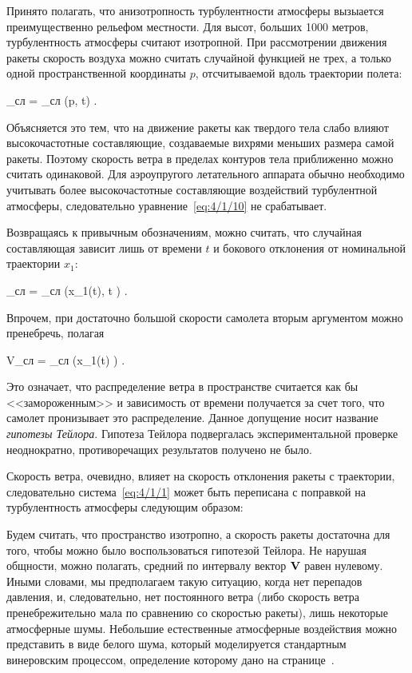Принято полагать, что анизотропность турбулентности атмосферы вызыается преимущественно рельефом местности. Для высот, больших 1000 метров, турбулентность атмосферы считают изотропной. При рассмотрении движения ракеты скорость воздуха можно считать случайной функцией не трех, а только одной пространственной координаты $p$, отсчитываемой вдоль траектории полета:

	_{\mbox{сл}} = _{\mbox{сл}} (p, t) \mbox{.}
\eeq

Объясняется это тем, что на движение ракеты как твердого тела слабо влияют высокочастотные составляющие\cite{KRASOVSKY}, создаваемые вихрями меньших размера самой ракеты. Поэтому скорость ветра в пределах контуров тела приближенно можно считать одинаковой. Для аэроупругого летательного аппарата обычно необходимо учитывать более высокочастотные составляющие воздействий турбулентной атмосферы, следовательно уравнение~\ref{eq:4/1/10} не срабатывает.

Возвращаясь к привычным обозначениям, можно считать, что случайная составляющая зависит лишь от времени $t$ и бокового отклонения от номинальной траектории $x_1$:

	_{\mbox{сл}} = _{\mbox{сл}} \bigl(x_1(t), t \bigr) \mbox{.}
\eeq

Впрочем, при достаточно большой скорости самолета вторым аргументом можно пренебречь, полагая

	V_{\mbox{сл}} = _{\mbox{сл}} \bigl(x_1(t) \bigr) \mbox{.}
\eeq

Это означает, что распределение ветра в пространстве считается как бы <<замороженным>> и зависимость от времени получается за счет того, что самолет пронизывает это распределение. Данное допущение носит название \emph{гипотезы Тейлора}\cite{MONIN}. Гипотеза Тейлора подвергалась экспериментальной проверке неоднократно, противоречащих результатов получено не было.

Скорость ветра, очевидно, влияет на скорость отклонения ракеты с траектории, следовательно система~\vref{eq:4/1/1} может быть переписана с поправкой на турбулентность атмосферы следующим образом:

\eeq

Будем считать, что пространство изотропно, а скорость ракеты достаточна для того, чтобы можно было воспользоваться гипотезой Тейлора. Не нарушая общности, можно полагать, средний по интервалу вектор $\mathbf{V}$ равен нулевому. Иными словами, мы предполагаем такую ситуацию, когда нет перепадов давления, и, следовательно, нет постоянного ветра (либо скорость ветра пренебрежительно мала по сравнению со скоростью ракеты), лишь некоторые атмосферные шумы. Небольшие естественные атмосферные воздействия можно представить в виде белого шума, который моделируется стандартным винеровским процессом, определение которому дано на странице~\pageref{df:6}.

